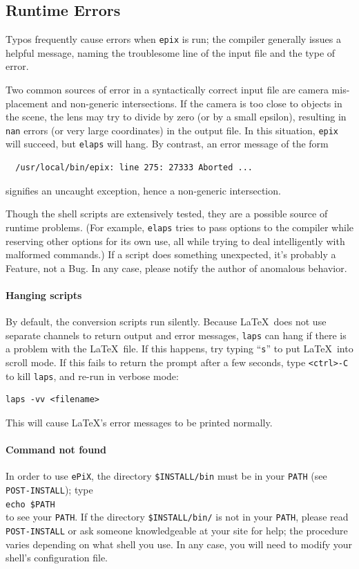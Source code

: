 \documentclass[12pt]{report}
\newcommand{\code}[1]{\texttt{#1}}
\newcommand{\filename}[1]{\texttt{#1}}
\newcommand{\ePiX}{\code{ePiX}}
\begin{document}
\subsection*{Runtime Errors}

Typos frequently cause errors when \code{epix} is run; the compiler
generally issues a helpful message, naming the troublesome line of the
input file and the type of error.

Two common sources of error in a syntactically correct input file are
camera mis-placement and non-generic intersections. If the camera is
too close to objects in the scene, the lens may try to divide by zero
(or by a small epsilon), resulting in \code{nan} errors (or very large
coordinates) in the output file. In this situation, \code{epix} will
succeed, but \code{elaps} will hang. By contrast, an error message of
the form
\begin{verbatim}
  /usr/local/bin/epix: line 275: 27333 Aborted ...
\end{verbatim}
signifies an uncaught exception, hence a non-generic intersection.

Though the shell scripts are extensively tested, they are a possible
source of runtime problems. (For example, \code{elaps} tries to pass
options to the compiler while reserving other options for its own use,
all while trying to deal intelligently with malformed commands.) If a
script does something unexpected, it's probably a Feature, not a Bug.
In any case, please notify the author of anomalous behavior.

\paragraph{Hanging scripts}
By default, the conversion scripts run silently. Because \LaTeX~does
not use separate channels to return output and error messages,
\code{laps} can hang if there is a problem with the \LaTeX\ file. If
this happens, try typing ``\code{s}'' to put \LaTeX\ into scroll mode.
If this fails to return the prompt after a few seconds, type
\verb+<ctrl>-C+ to kill \code{laps}, and re-run in verbose mode:
\begin{verbatim}
laps -vv <filename>
\end{verbatim}
This will cause \LaTeX's error messages to be printed normally.

\paragraph{Command not found} In order to use \ePiX, the directory
\filename{\$INSTALL/bin} must be in your \code{PATH} (see 
\filename{POST-INSTALL}); type\\
\code{echo \$PATH}\\
\noindent to see your \code{PATH}. If the directory
\filename{\$INSTALL/bin/} is not in your \code{PATH}, please read
\filename{POST-INSTALL} or ask someone knowledgeable at your site for
help; the procedure varies depending on what shell you use. In any
case, you will need to modify your shell's configuration file.
\end{document}

